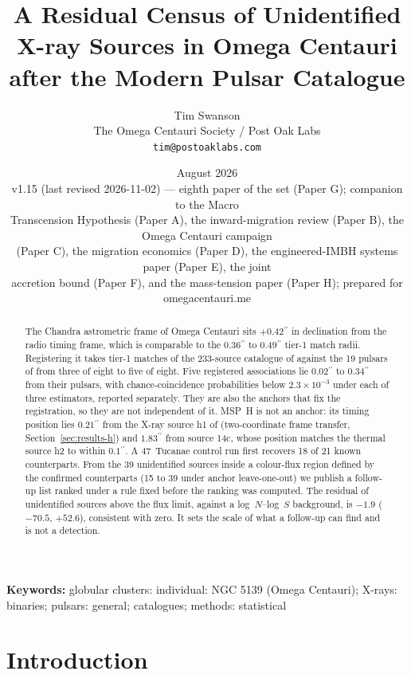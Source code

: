 \documentclass[11pt]{article}
\title{\textbf{A Residual Census of Unidentified X-ray Sources in Omega Centauri after the Modern Pulsar Catalogue}}
\author{Tim Swanson\\[2pt]
\small The Omega Centauri Society / Post Oak Labs\\
\small \texttt{tim@postoaklabs.com}}
\date{August 2026 \\[4pt] \small v1.15 (last revised 2026-11-02) --- eighth paper of the set (Paper G); companion to the Macro\\ \small Transcension Hypothesis (Paper A), the inward-migration review (Paper B), the Omega Centauri campaign\\ \small (Paper C), the migration economics (Paper D), the engineered-IMBH systems paper (Paper E), the joint\\ \small accretion bound (Paper F), and the mass-tension paper (Paper H); prepared for omegacentauri.me}
\newcommand{\as}{\ensuremath{^{\prime\prime}}}
\begin{document}
\maketitle

\begin{abstract}
\noindent
The Chandra astrometric frame of Omega Centauri sits $+0.42\as$ in declination from the radio timing frame, which is comparable to the $0.36\as$ to $0.49\as$ tier-1 match radii. Registering it takes tier-1 matches of the 233-source catalogue of \citet{Henleywillis2018} against the 19 pulsars of \citet{ColomiBernadich2026} from three of eight to five of eight. Five registered associations lie $0.02\as$ to $0.34\as$ from their pulsars, with chance-coincidence probabilities below $2.3\times10^{-3}$ under each of three estimators, reported separately. They are also the anchors that fix the registration, so they are not independent of it. MSP~H is not an anchor: its timing position lies $0.21\as$ from the X-ray source h1 of \citet{ZhaoHeinke2023} (two-coordinate frame transfer, Section~\ref{sec:results-h}) and $1.83\as$ from \citet{Henleywillis2018} source 14c, whose position matches the thermal source h2 to within $0.1\as$. A 47~Tucanae control run first recovers 18 of 21 known counterparts. From the 39 unidentified sources inside a colour-flux region defined by the confirmed counterparts (15 to 39 under anchor leave-one-out) we publish a follow-up list ranked under a rule fixed before the ranking was computed. The residual of unidentified sources above the flux limit, against a log~$N$--log~$S$ background, is $-1.9$ ($-70.5$, $+52.6$), consistent with zero. It sets the scale of what a follow-up can find and is not a detection.
\end{abstract}

\bigskip
\noindent\textbf{Keywords:} globular clusters: individual: NGC 5139 (Omega Centauri); X-rays: binaries; pulsars: general; catalogues; methods: statistical

\newpage
\tableofcontents
\newpage

\section{Introduction}
\label{sec:intro}
\end{document}
